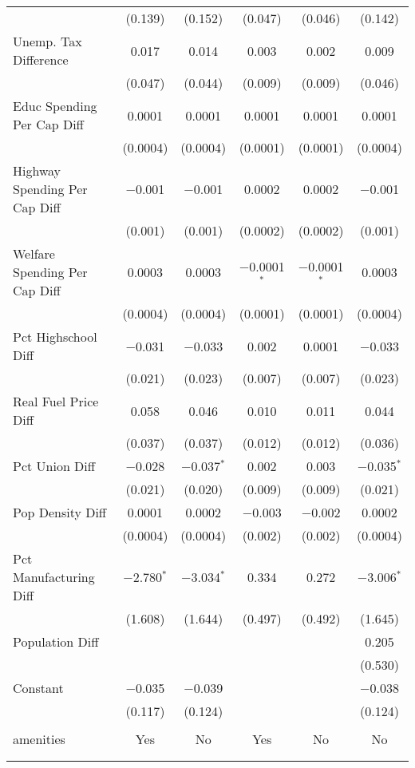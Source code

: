 \begin{table}[!htbp]
\begin{tabular}{@{\extracolsep{5pt}}lccccc}
  & (0.139) & (0.152) & (0.047) & (0.046) & (0.142) \\ 
  Unemp. Tax Difference & 0.017 & 0.014 & 0.003 & 0.002 & 0.009 \\ 
  & (0.047) & (0.044) & (0.009) & (0.009) & (0.046) \\ 
  Educ Spending Per Cap Diff & 0.0001 & 0.0001 & 0.0001 & 0.0001 & 0.0001 \\ 
  & (0.0004) & (0.0004) & (0.0001) & (0.0001) & (0.0004) \\ 
  Highway Spending Per Cap Diff & $-$0.001 & $-$0.001 & 0.0002 & 0.0002 & $-$0.001 \\ 
  & (0.001) & (0.001) & (0.0002) & (0.0002) & (0.001) \\ 
  Welfare Spending Per Cap Diff & 0.0003 & 0.0003 & $-$0.0001$^{*}$ & $-$0.0001$^{*}$ & 0.0003 \\ 
  & (0.0004) & (0.0004) & (0.0001) & (0.0001) & (0.0004) \\ 
  Pct Highschool Diff & $-$0.031 & $-$0.033 & 0.002 & 0.0001 & $-$0.033 \\ 
  & (0.021) & (0.023) & (0.007) & (0.007) & (0.023) \\ 
  Real Fuel Price Diff & 0.058 & 0.046 & 0.010 & 0.011 & 0.044 \\ 
  & (0.037) & (0.037) & (0.012) & (0.012) & (0.036) \\ 
  Pct Union Diff & $-$0.028 & $-$0.037$^{*}$ & 0.002 & 0.003 & $-$0.035$^{*}$ \\ 
  & (0.021) & (0.020) & (0.009) & (0.009) & (0.021) \\ 
  Pop Density Diff & 0.0001 & 0.0002 & $-$0.003 & $-$0.002 & 0.0002 \\ 
  & (0.0004) & (0.0004) & (0.002) & (0.002) & (0.0004) \\ 
  Pct Manufacturing Diff & $-$2.780$^{*}$ & $-$3.034$^{*}$ & 0.334 & 0.272 & $-$3.006$^{*}$ \\ 
  & (1.608) & (1.644) & (0.497) & (0.492) & (1.645) \\ 
  Population Diff &  &  &  &  & 0.205 \\ 
  &  &  &  &  & (0.530) \\ 
  Constant & $-$0.035 & $-$0.039 &  &  & $-$0.038 \\ 
  & (0.117) & (0.124) &  &  & (0.124) \\ 
 \hline \\[-1.8ex] 
amenities & Yes & No & Yes & No & No \\ 
\hline \\[-1.8ex] 
\hline 
\hline \\[-1.8ex] 
\end{tabular} 
\end{table} 
